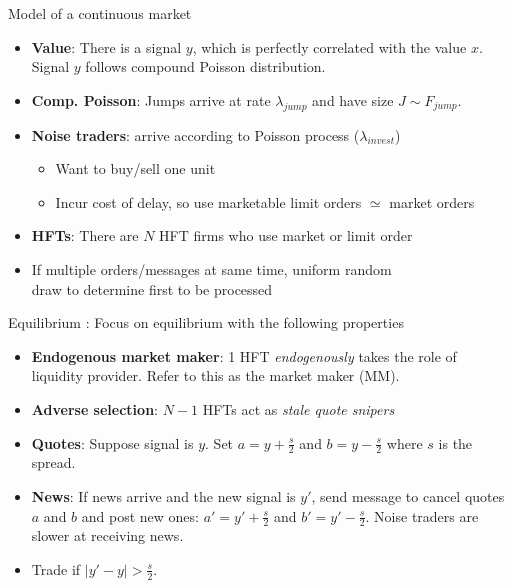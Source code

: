 \documentclass[english,10pt
,aspectratio=169
]{beamer}
\begin{document}
\begin{frame}{Model of a continuous market}
	\begin{itemize}
		\item \textbf{Value}: There is a signal $y$, which is perfectly correlated with the value $x$. Signal $y$ follows compound Poisson distribution.
		\item \textbf{Comp. Poisson}: Jumps arrive at rate $\lambda_{jump}$ and have size $J \sim F_{jump}$.
	\end{itemize}
	\begin{itemize}
		\item \textbf{Noise traders}: arrive according to Poisson process ($\lambda_{invest}$)
		\begin{itemize}
			\item Want to buy/sell one unit
			\item Incur cost of delay, so use marketable limit orders $\simeq$ market orders
		\end{itemize}
		\item \textbf{HFTs}: There are $N$ HFT firms who use market or limit order
	\end{itemize}
	\begin{itemize}
		\item If multiple orders/messages at same time, uniform random \\ draw to determine first to be processed
	\end{itemize}
\end{frame}


\begin{frame}{Equilibrium}
	: Focus on equilibrium with the following properties
	\begin{itemize}
		\item \textbf{Endogenous market maker}: 1 HFT \textit{endogenously} takes the role of liquidity provider. Refer to this as the market maker (MM).
		\item \textbf{Adverse selection}: $N-1$ HFTs act as \textit{stale quote snipers}
	\end{itemize}
	\begin{itemize}
		\item \textbf{Quotes}: Suppose signal is  $y$. Set $a=y+\frac{s}{2}$ and $b=y-\frac{s}{2}$ where $s$ is the spread.
		\item \textbf{News}: If news arrive and the new signal is $y'$, send message to cancel quotes $a$ and $b$ and post new ones: $a'=y'+\frac{s}{2}$ and $b'=y'-\frac{s}{2}$. Noise traders are slower at receiving news.
	\end{itemize}
	\begin{itemize}
		\item Trade if $|y'-y|>\frac{s}{2}$.
	\end{itemize}
\end{frame}
\end{document}
